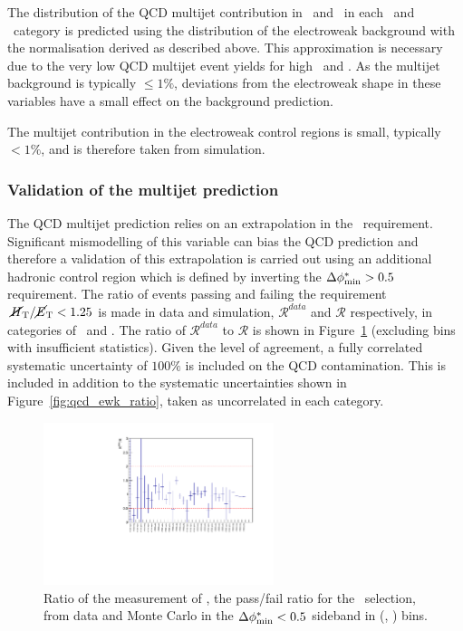 The distribution of the QCD multijet contribution in \nb ~and \mht~in each \scalht~and \njet~category
is predicted using the distribution of the electroweak background with the normalisation
derived as described above. This approximation is necessary due to the very low QCD multijet
event yields for high \nb ~and \mht. As the multijet background is typically $\le 1\%$, 
deviations from the electroweak shape in these variables have a small effect on the background prediction.

The multijet contribution in the electroweak control regions is small, typically $<1\%$, and is 
therefore taken from simulation.

\subsubsection{Validation of the multijet prediction}

The QCD multijet prediction relies on an extrapolation in the \mhtmet~requirement.
Significant mismodelling of this variable can bias the QCD prediction and therefore a validation
of this extrapolation is carried out using an additional hadronic control 
region which is defined by inverting the $\mbox{$\Delta\phi^{*}_{\rm min}$} > 0.5$ requirement. The ratio of events passing and failing 
the requirement $\mbox{$\mbox{$\,\cancel{H}_{\rm T}$} / \mbox{$\cancel{E}_\text{T}$}$} < 1.25$ is made in data and simulation, $\mathcal{R}^{data}$ and $\mathcal{R}$ respectively,
in categories of \njet~and \scalht. The ratio of $\mathcal{R}^{data}$ to $\mathcal{R}$ is shown in
Figure~\ref{fig:RR_qcd} (excluding bins with insufficient statistics). 
Given the level of agreement, a fully correlated systematic uncertainty of $100\%$ is included on
the QCD contamination. This is included in addition to the systematic uncertainties shown in 
Figure~\ref{fig:qcd_ewk_ratio}, taken as uncorrelated in each category.

\begin{figure}[h!]
  \begin{center}        
    \includegraphics[width=0.6\textwidth]{figures/qcd/plots/doubleQcdSbSrRatio1D}
    \caption{ Ratio of the measurement of \rmhtmet, the pass/fail ratio for the \mhtmet~selection, from data and Monte Carlo in the $\mbox{$\Delta\phi^{*}_{\rm min}$} < 0.5$ sideband in (\scalht, \njet) bins.  
    }
    \label{fig:RR_qcd}
  \end{center} 
\end{figure}


